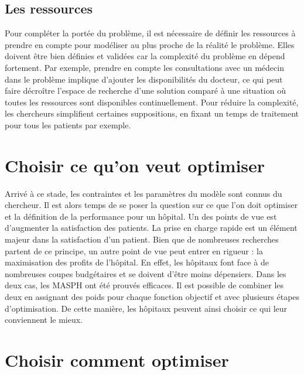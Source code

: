 \documentclass[noposter]{polytech/polytech}
\begin{document}
\subsection{Les ressources}

Pour compléter la portée du problème, il est nécessaire de définir les ressources à prendre en compte pour modéliser au plus proche de la réalité le problème. Elles doivent être bien définies et validées car la complexité du problème en dépend fortement. Par exemple, prendre en compte les consultations avec un médecin dans le problème implique d'ajouter les disponibilités du docteur, ce qui peut faire décroître l'espace de recherche d'une solution comparé à une situation où toutes les ressources sont disponibles continuellement. Pour réduire la complexité, les chercheurs simplifient certaines suppositions, en fixant un temps de traitement pour tous les patients par exemple.


\section{Choisir ce qu'on veut optimiser}

Arrivé à ce stade, les contraintes et les paramètres du modèle sont connus du chercheur. Il est alors temps de se poser la question sur ce que l'on doit optimiser et la définition de la performance pour un hôpital. Un des points de vue est d'augmenter la satisfaction des patients. La prise en charge rapide est un élément majeur dans la satisfaction d'un patient. Bien que de nombreuses recherches partent de ce principe, un autre point de vue peut entrer en rigueur : la maximisation des profits de l'hôpital. En effet, les hôpitaux font face à de nombreuses coupes budgétaires et se doivent d'être moins dépensiers. Dans les deux cas, les MASPH ont été prouvés efficaces. Il est possible de combiner les deux en assignant des poids pour chaque fonction objectif et avec plusieurs étapes d'optimisation. De cette manière, les hôpitaux peuvent ainsi choisir ce qui leur conviennent le mieux. 


\section{Choisir comment optimiser}
\end{document}
